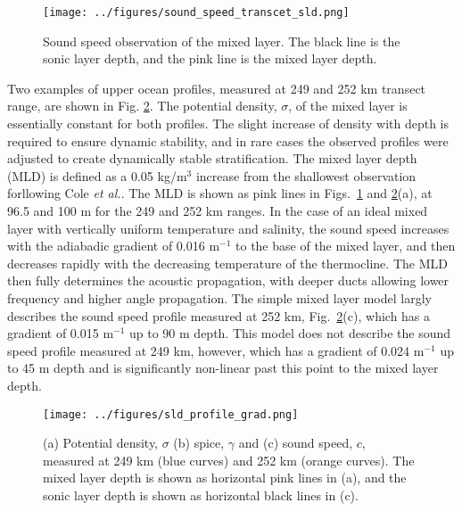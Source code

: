 \documentclass[preprint,NumberedRefs]{JASA}
\begin{document}
\begin{figure}
\texttt{[image: ../figures/sound\_speed\_transcet\_sld.png]}
\caption{\label{fig:c_grid}{Sound speed observation of the mixed layer. The black line is the sonic layer depth, and the pink line is the mixed layer depth.}}
\end{figure}

Two examples of upper ocean profiles, measured at 249 and 252 km transect range, are shown in Fig. \ref{fig:profiles}. The potential density, $\sigma$, of the mixed layer is essentially constant for both profiles. The slight increase of density with depth is required to ensure dynamic stability, and in rare cases the observed profiles were adjusted to create dynamically stable stratification\citep{barker2017stabilizing}. The mixed layer depth (MLD) is defined as a 0.05 kg/m$^3$ increase from the shallowest observation forllowing Cole \emph{et al.}\cite{cole2010seasonal}. The MLD is shown as pink lines in Figs.~\ref{fig:c_grid} and \ref{fig:profiles}(a), at 96.5 and 100 m for the 249 and 252 km ranges. In the case of an ideal mixed layer with vertically uniform temperature and salinity, the sound speed increases with the adiabadic gradient of 0.016 m$^{-1}$ to the base of the mixed layer, and then decreases rapidly with the decreasing temperature of the thermocline. The MLD then fully determines the acoustic propagation, with deeper ducts allowing lower frequency and higher angle propagation. The simple mixed layer model largly describes the sound speed profile measured at 252 km, Fig.~\ref{fig:profiles}(c), which has a gradient of 0.015 m$^{-1}$ up to 90 m depth. This model does not describe the sound speed profile measured at 249 km, however, which has a gradient of 0.024 m$^{-1}$ up to 45 m depth and is significantly non-linear past this point to the mixed layer depth.
\begin{figure}
\texttt{[image: ../figures/sld\_profile\_grad.png]}
    \caption{\label{fig:profiles}{(a) Potential density, $\sigma$ (b) spice, $\gamma$ and (c) sound speed, $c$, measured at 249 km (blue curves) and 252 km (orange curves). The mixed layer depth is shown as horizontal pink lines in (a), and the sonic layer depth is shown as horizontal black lines in (c).}}
\end{figure}
\end{document}
